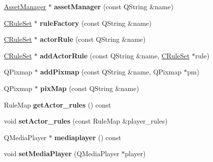 \begin{DoxyCompactItemize}
\mbox{\label{classmfg_1_1_engine_a2add7951cfef6093f77d07c7780d4def}} 
\hyperlink{class_asset_manager}{Asset\+Manager} $\ast$ {\bfseries asset\+Manager} (const Q\+String \&name)
\item 
\mbox{\label{classmfg_1_1_engine_ae33d266c7c1c81c4e78198868b903a14}} 
\hyperlink{class_c_rule_set}{C\+Rule\+Set} $\ast$ {\bfseries rule\+Factory} (const Q\+String \&name)
\item 
\mbox{\label{classmfg_1_1_engine_a1c84944fcfc2248dba44160a132c0f1b}} 
\hyperlink{class_c_rule_set}{C\+Rule\+Set} $\ast$ {\bfseries actor\+Rule} (const Q\+String \&name)
\item 
\mbox{\label{classmfg_1_1_engine_a4b6eb698bdf7147ac5a371eaeef330dc}} 
\hyperlink{class_c_rule_set}{C\+Rule\+Set} $\ast$ {\bfseries add\+Actor\+Rule} (const Q\+String \&name, \hyperlink{class_c_rule_set}{C\+Rule\+Set} $\ast$rule)
\item 
\mbox{\label{classmfg_1_1_engine_a2467edce40ee2d41b688d047df2396b0}} 
Q\+Pixmap $\ast$ {\bfseries add\+Pixmap} (const Q\+String \&name, Q\+Pixmap $\ast$pm)
\item 
\mbox{\label{classmfg_1_1_engine_ad212205e8b53041f1284013ff4a7eacb}} 
Q\+Pixmap $\ast$ {\bfseries pix\+Map} (const Q\+String \&name)
\item 
\mbox{\label{classmfg_1_1_engine_a6ef9267c4fc390f42ae27baef1c6f701}} 
Rule\+Map {\bfseries get\+Actor\+\_\+rules} () const
\item 
\mbox{\label{classmfg_1_1_engine_aacf5e27746b15291536e0573cfc4e415}} 
void {\bfseries set\+Actor\+\_\+rules} (const Rule\+Map \&player\+\_\+rules)
\item 
\mbox{\label{classmfg_1_1_engine_af4126c00eb8ac07bd8bc56f67f4b0890}} 
Q\+Media\+Player $\ast$ {\bfseries mediaplayer} () const
\item 
\mbox{\label{classmfg_1_1_engine_ae9401d26bc77d69553e9d4d58bc7ce22}} 
void {\bfseries set\+Media\+Player} (Q\+Media\+Player $\ast$player)

\end{DoxyCompactItemize}
